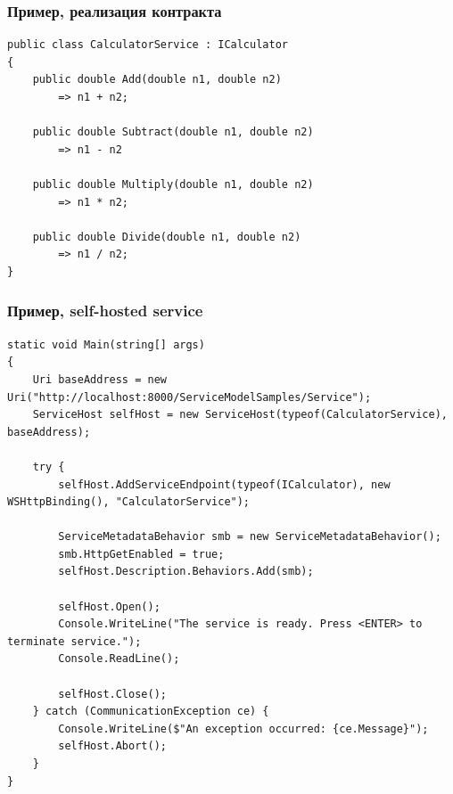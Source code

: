 \documentclass[xetex,mathserif,serif]{beamer}
\begin{document}
    \begin{frame}[fragile]
        \frametitle{Пример, реализация контракта}
        \begin{small}
            \begin{verbatim}
public class CalculatorService : ICalculator  
{
    public double Add(double n1, double n2)
        => n1 + n2;  

    public double Subtract(double n1, double n2)
        => n1 - n2

    public double Multiply(double n1, double n2)  
        => n1 * n2;

    public double Divide(double n1, double n2)  
        => n1 / n2;
}
            \end{verbatim}
        \end{small}
    \end{frame}

    \begin{frame}[fragile]
        \frametitle{Пример, self-hosted service}
        \begin{scriptsize}
            \begin{verbatim}
static void Main(string[] args) 
{
    Uri baseAddress = new Uri("http://localhost:8000/ServiceModelSamples/Service");
    ServiceHost selfHost = new ServiceHost(typeof(CalculatorService), baseAddress);

    try {
        selfHost.AddServiceEndpoint(typeof(ICalculator), new WSHttpBinding(), "CalculatorService");

        ServiceMetadataBehavior smb = new ServiceMetadataBehavior();
        smb.HttpGetEnabled = true;
        selfHost.Description.Behaviors.Add(smb);

        selfHost.Open();
        Console.WriteLine("The service is ready. Press <ENTER> to terminate service.");
        Console.ReadLine();

        selfHost.Close();  
    } catch (CommunicationException ce) {
        Console.WriteLine($"An exception occurred: {ce.Message}");
        selfHost.Abort();
    }
}
            \end{verbatim}
        \end{scriptsize}
    \end{frame}
\end{document}
